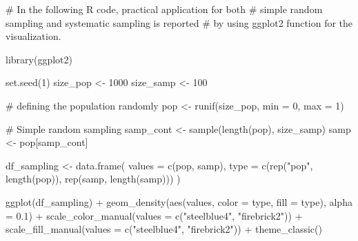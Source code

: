 \documentclass[
  letterpaper,
  DIV=11,
  numbers=noendperiod]{scrreprt}
\newenvironment{Shaded}{\begin{snugshade}}{\end{snugshade}}
\newcommand{\AttributeTok}[1]{\textcolor[rgb]{0.40,0.45,0.13}{#1}}
\newcommand{\CommentTok}[1]{\textcolor[rgb]{0.37,0.37,0.37}{#1}}
\newcommand{\DecValTok}[1]{\textcolor[rgb]{0.68,0.00,0.00}{#1}}
\newcommand{\FloatTok}[1]{\textcolor[rgb]{0.68,0.00,0.00}{#1}}
\newcommand{\FunctionTok}[1]{\textcolor[rgb]{0.28,0.35,0.67}{#1}}
\newcommand{\NormalTok}[1]{\textcolor[rgb]{0.00,0.23,0.31}{#1}}
\newcommand{\OtherTok}[1]{\textcolor[rgb]{0.00,0.23,0.31}{#1}}
\newcommand{\SpecialCharTok}[1]{\textcolor[rgb]{0.37,0.37,0.37}{#1}}
\newcommand{\StringTok}[1]{\textcolor[rgb]{0.13,0.47,0.30}{#1}}
\begin{document}
\begin{Shaded}
\begin{Highlighting}[]
\CommentTok{\# In the following R code, practical application for both }
\CommentTok{\# simple random sampling and systematic sampling is reported }
\CommentTok{\# by using ggplot2 function for the visualization.}

\FunctionTok{library}\NormalTok{(ggplot2)}

\FunctionTok{set.seed}\NormalTok{(}\DecValTok{1}\NormalTok{)}
\NormalTok{size\_pop }\OtherTok{\textless{}{-}} \DecValTok{1000}
\NormalTok{size\_samp }\OtherTok{\textless{}{-}} \DecValTok{100}

\CommentTok{\# defining the population randomly}
\NormalTok{pop }\OtherTok{\textless{}{-}} \FunctionTok{runif}\NormalTok{(size\_pop, }\AttributeTok{min =} \DecValTok{0}\NormalTok{, }\AttributeTok{max =} \DecValTok{1}\NormalTok{)}

\CommentTok{\# Simple random sampling}
\NormalTok{samp\_cont }\OtherTok{\textless{}{-}} \FunctionTok{sample}\NormalTok{(}\FunctionTok{length}\NormalTok{(pop), size\_samp)}
\NormalTok{samp }\OtherTok{\textless{}{-}}\NormalTok{ pop[samp\_cont]}


\NormalTok{df\_sampling }\OtherTok{\textless{}{-}} \FunctionTok{data.frame}\NormalTok{(}
  \AttributeTok{values =} \FunctionTok{c}\NormalTok{(pop, samp),}
  \AttributeTok{type =} \FunctionTok{c}\NormalTok{(}\FunctionTok{rep}\NormalTok{(}\StringTok{"pop"}\NormalTok{, }\FunctionTok{length}\NormalTok{(pop)), }\FunctionTok{rep}\NormalTok{(}\StringTok{\textquotesingle{}samp\textquotesingle{}}\NormalTok{, }\FunctionTok{length}\NormalTok{(samp)))}
\NormalTok{)}

\FunctionTok{ggplot}\NormalTok{(df\_sampling) }\SpecialCharTok{+} 
  \FunctionTok{geom\_density}\NormalTok{(}\FunctionTok{aes}\NormalTok{(values, }\AttributeTok{color =}\NormalTok{ type, }\AttributeTok{fill =}\NormalTok{ type), }\AttributeTok{alpha =} \FloatTok{0.1}\NormalTok{) }\SpecialCharTok{+} 
  \FunctionTok{scale\_color\_manual}\NormalTok{(}\AttributeTok{values =} \FunctionTok{c}\NormalTok{(}\StringTok{"steelblue4"}\NormalTok{, }\StringTok{"firebrick2"}\NormalTok{)) }\SpecialCharTok{+} 
  \FunctionTok{scale\_fill\_manual}\NormalTok{(}\AttributeTok{values =} \FunctionTok{c}\NormalTok{(}\StringTok{"steelblue4"}\NormalTok{, }\StringTok{"firebrick2"}\NormalTok{)) }\SpecialCharTok{+} 
  \FunctionTok{theme\_classic}\NormalTok{()}
\end{Highlighting}
\end{Shaded}
\end{document}
